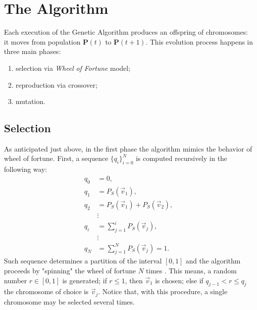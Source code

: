 \documentclass[%
    corpo=11pt,
    twoside,
    stile=classica,
    oldstyle,
    autoretitolo,
    tipotesi=magistrale,
    greek,
    evenboxes,
    english
]{toptesi}
\begin{document}
\section{The Algorithm}
Each execution of the Genetic Algorithm produces an offspring of chromosomes: it moves from  population $\textbf{P}(t)$ to $\textbf{P}(t+1)$. This evolution process happens in three main phases:
\begin{enumerate}
\item selection via \textit{Wheel of Fortune} model;
\item reproduction via crossover;
\item mutation.
\end{enumerate}
\subsection{Selection}
As anticipated just above, in the first phase the algorithm mimics the behavior of wheel of fortune. First, a sequence $\{q_i\}_{i=0}^{N}$ is computed recursively in the following way:
\begin{align}
q_0 &= 0, \nonumber \\
q_1 &= P_S(\vec{v}_1), \nonumber \\
q_2 &= P_S(\vec{v}_1) + P_S(\vec{v}_2), \nonumber \\
&\vdots \nonumber \\
q_i &= \sum_{j=1}^{i}P_S(\vec{v}_j), \nonumber \\
&\vdots \nonumber \\
q_N &= \sum_{j=1}^{N}P_S(\vec{v}_j) = 1.
\end{align}
Such sequence determines a partition of the interval $\left[0,1\right]$ and the algorithm proceeds by "spinning" the wheel of fortune $N$ times . This means, a random number $r\in \left[0,1\right]$ is generated; if $r \leq 1$, then $\vec{v}_1$ is chosen; else if $q_{j-1} < r \leq q_j$ the chromosome of choice is $\vec{v}_j$. Notice that, with this procedure, a single chromosome may be selected several times. 
\end{document}
